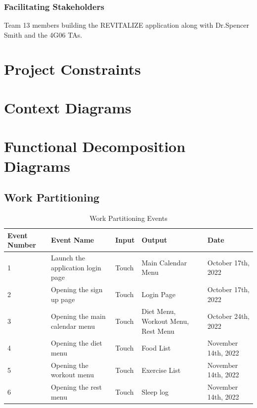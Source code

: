 \documentclass[12pt,letterpaper]{article}
\begin{document}
\subsubsection{Facilitating Stakeholders}
Team 13 members building the REVITALIZE application along with Dr.Spencer Smith and the 4G06 TAs.

\section{Project Constraints}

\section{Context Diagrams}

\section{Functional Decomposition Diagrams}

\subsection{Work Partitioning}
\begin{table}[h!]
\caption{Work Partitioning Events}
\centering
\begin{tabularx}{\columnwidth}{|X|X|X|X|X|}
	\hline
	\centering\textbf{Event Number} & \centering\textbf{Event Name} & \centering\textbf{Input} & \centering\textbf{Output} & \textbf{Date}\\
	\hline
	1 & Launch the application login page & Touch & Main Calendar Menu & October 17th, 2022\\
	\hline
	2 & Opening the sign up page & Touch & Login Page & October 17th, 2022\\
	\hline
	3 & Opening the main calendar menu & Touch & Diet Menu, Workout Menu, Rest Menu & October 24th, 2022\\
	\hline
	4 & Opening the diet menu  & Touch & Food List & November 14th, 2022\\
	\hline
	5 & Opening the workout menu & Touch & Exercise List & November 14th, 2022\\
	\hline
	6 & Opening the rest menu & Touch & Sleep log &  November 14th, 2022\\
	\hline
\end{tabularx}
\end{table}
\end{document}
